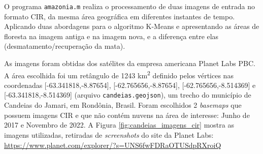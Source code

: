 \documentclass[11pt]{article}
\begin{document}
O programa \verb|amazonia.m| realiza o processamento de duas imagens de entrada no formato CIR, da mesma área geográfica em diferentes instantes de tempo. Aplicando duas abordagens para o algoritmo K-Means e apresentando as áreas de floresta na imagem antiga e na imagem nova, e a diferença entre elas (desmatamento/recuperação da mata).

As imagens foram obtidas dos satélites da empresa americana Planet Labs PBC. A área escolhida foi um retângulo de 1243 km\textsuperscript{2} definido pelos vértices nas coordenadas [-63.341818,-8.87654], [-62.765656,-8.87654], [-62.765656,-8.514369] e [-63.341818,-8.514369] (arquivo \verb|candeias.geojson|), um trecho do município de Candeias do Jamari, em Rondônia, Brasil. Foram escolhidos 2 \textit{basemaps} que possuem imagens CIR e que não contém nuvens na área de interesse: Junho de 2017 e Novembro de 2022. A Figura \ref{fig:candeias_imagens_cir} mostra as imagens utilizadas, retiradas de \textit{screenshots} do site da Planet Labs: \url{https://www.planet.com/explorer/?s=UNS6fwFDRaOTUSdpRXroiQ}
\end{document}
